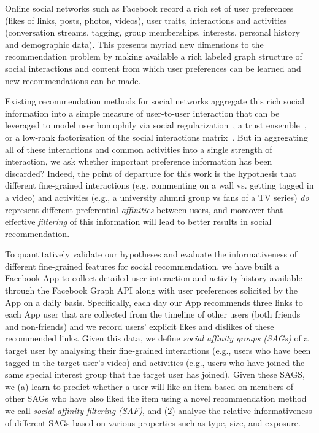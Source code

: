 
\label{sec:introduction}

Online social networks such as Facebook record a rich set of user
preferences (likes of links, posts, photos, videos), user traits,
interactions and activities (conversation streams, tagging, group
memberships, interests, personal history and demographic data).  This
presents myriad new dimensions to the recommendation problem by making
available a rich labeled graph structure of social interactions and
content from which user preferences can be learned and new
recommendations can be made.

Existing recommendation methods for social networks aggregate this
rich social information into a simple measure of user-to-user interaction 
that can be leveraged to model user homophily via social
regularization~\cite{lla,socinf,sr,rrmf, Noel2012NOF}, a trust
ensemble~\cite{ste}, or a low-rank factorization of the social
interactions matrix~\cite{sorec}.  But in aggregating all of these
interactions and common activities into a single strength of
interaction, we ask whether important preference information has been
discarded?  Indeed, the point of departure for this work is the
hypothesis that different fine-grained interactions (e.g. commenting
on a wall vs. getting tagged in a video) and activities (e.g., a
university alumni group vs fans of a TV series) \emph{do} represent different
preferential {\em affinities} between users, and moreover that effective
{\em filtering} of this information will lead to better results in
social recommendation.


To quantitatively validate our hypotheses and evaluate the
informativeness of different fine-grained features for social
recommendation, we have built a Facebook App to collect detailed user
interaction and activity history available through the Facebook Graph
API along with user preferences solicited by the App on a daily basis.
Specifically, each day our App recommends three links to each App user 
that are collected from the timeline of other users (both friends and
non-friends) and we record users' explicit likes and dislikes of these
recommended links.  Given this data, we define \emph{social affinity
groups (SAGs)} of a target user by analysing their fine-grained
interactions (e.g., users who have been tagged in the target user's
video) and activities (e.g., users who have joined the same special
interest group that the target user has joined).  Given these SAGS, we
(a) learn to predict whether a user will like an item based on members
of other SAGs who have also liked the item using a novel
recommendation method we call {\em social affinity filtering (SAF)},
and (2) analyse the relative informativeness of different SAGs based
on various properties such as type, size, and exposure.

